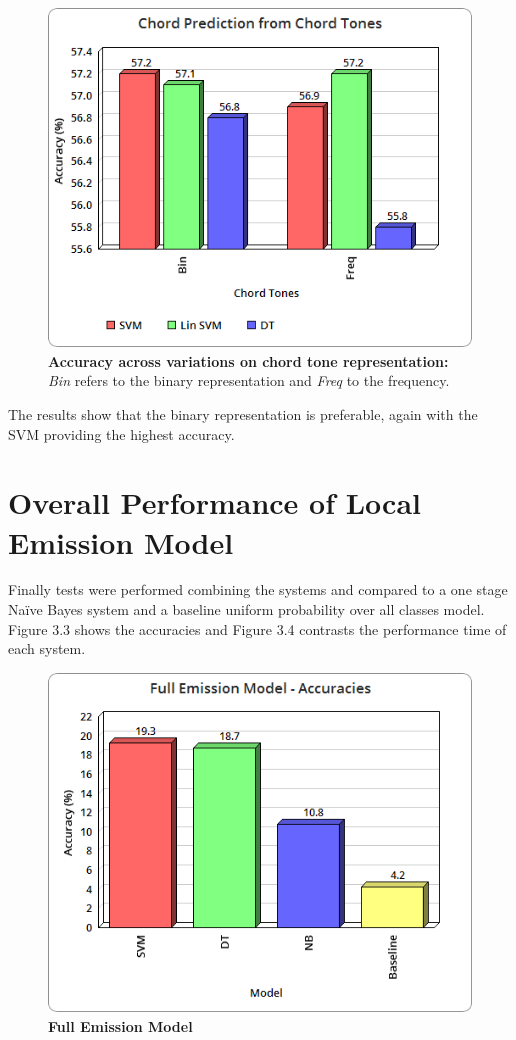 \documentclass[bsc,singlespacing,parskip,deptreport,twoside,frontabs]{infthesis}
\begin{document}
\begin{figure}
  \caption{\textbf{Accuracy across variations on chord tone representation:} \emph{Bin} refers to the binary representation and \emph{Freq} to the frequency.}
  \centering
    \includegraphics[scale=0.5]{ch}
\end{figure}

The results show that the binary representation is preferable, again with the SVM providing the highest accuracy.

\section{Overall Performance of Local Emission Model}

Finally tests were performed combining the systems and compared to a one stage Na\"ive Bayes system and a baseline uniform probability over all classes model. Figure 3.3 shows the accuracies and Figure 3.4 contrasts the performance time of each system.

\begin{figure}
  \caption{\textbf{Full Emission Model}}
  \centering
    \includegraphics[scale=0.5]{em}
\end{figure}
\end{document}
